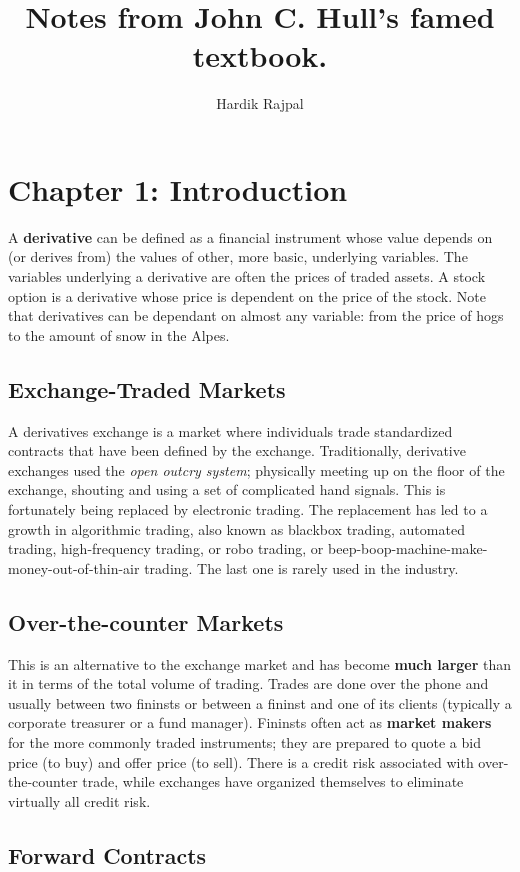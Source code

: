 \documentclass{article}
\author{Hardik Rajpal}
\title{Notes from John C. Hull's famed textbook.}
\begin{document}
\maketitle
\section{Chapter 1: Introduction}
A \textbf{derivative} can be defined as a financial instrument whose value depends on (or
derives from) the values of other, more basic, underlying variables. The variables 
underlying a derivative are often the prices of traded assets. A stock option is a
derivative whose price is dependent on the price of the stock. Note that derivatives
can be dependant on almost any variable: from the price of hogs to the amount
of snow in the Alpes.
\subsection{Exchange-Traded Markets}
A derivatives exchange is a market where individuals trade standardized contracts that
have been defined by the exchange. Traditionally, derivative exchanges used the 
\emph{open outcry system}; physically meeting up on the floor of the exchange, shouting
and using a set of complicated hand signals. This is fortunately being replaced by
electronic trading. The replacement has led to a growth in algorithmic trading,
also known as blackbox trading, automated trading, high-frequency trading, or robo trading,
or beep-boop-machine-make-money-out-of-thin-air trading. The last one is rarely used in
the industry.
\subsection{Over-the-counter Markets}
This is an alternative to the exchange market and has become \textbf{much larger} than it in terms
of the total volume of trading. Trades are done over the phone and usually between
two fininsts or between a fininst and one of its clients (typically a corporate treasurer
or a fund manager). Fininsts often act as \textbf{market makers} for the more commonly
traded instruments; they are prepared to quote a bid price (to buy) and offer price (to sell).
There is a credit risk associated with over-the-counter trade, while exchanges have
organized themselves to eliminate virtually all credit risk.
\subsection{Forward Contracts}
\end{document}
